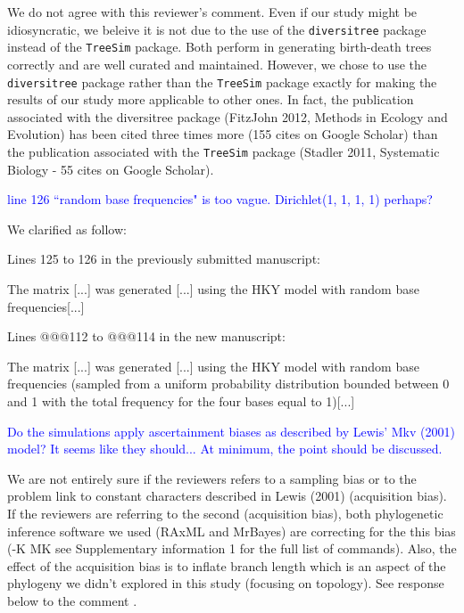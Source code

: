 \documentclass[11pt]{letter}
\begin{document}
\begin{letter}{}
We do not agree with this reviewer's comment. Even if our study might be idiosyncratic, we beleive it is not due to the use of the \texttt{diversitree} package instead of the \texttt{TreeSim} package. Both perform in generating birth-death trees correctly and are well curated and maintained. However, we chose to use the \texttt{diversitree} package rather than the \texttt{TreeSim} package exactly for making the results of our study more applicable to other ones. In fact, the publication associated with the diversitree package (FitzJohn 2012, Methods in Ecology and Evolution) has been cited three times more (155 cites on Google Scholar) than the publication associated with the \texttt{TreeSim} package (Stadler 2011, Systematic Biology - 55 cites on Google Scholar).

\textcolor{blue}{line 126 ``random base frequencies" is too vague. Dirichlet(1, 1, 1, 1) perhaps?}

We clarified as follow:

Lines 125 to 126 in the previously submitted manuscript:

\hfill\begin{minipage}{\dimexpr\textwidth-1cm}
The matrix [...] was generated [...] using the HKY model with random base frequencies[...]
\end{minipage}

Lines @@@112 to @@@114 in the new manuscript:

\hfill\begin{minipage}{\dimexpr\textwidth-1cm}
The matrix [...] was generated [...] using the HKY model with random base frequencies (sampled from a uniform probability distribution bounded between 0 and 1 with the total frequency for the four bases equal to 1)[...]
\end{minipage}

\textcolor{blue}{Do the simulations apply ascertainment biases as described by Lewis' Mkv (2001) model? It seems like they should... At minimum, the point should be discussed.}

We are not entirely sure if the reviewers refers to a sampling bias or to the problem link to constant characters described in Lewis (2001) (acquisition bias). If the reviewers are referring to the second (acquisition bias), both phylogenetic inference software we used (RAxML and MrBayes) are correcting for the this bias (-K MK  see Supplementary information 1 for the full list of commands). Also, the effect of the acquisition bias is to inflate branch length which is an aspect of the phylogeny we didn't explored in this study (focusing on topology). See response below to the comment .


\end{letter}
\end{document}
